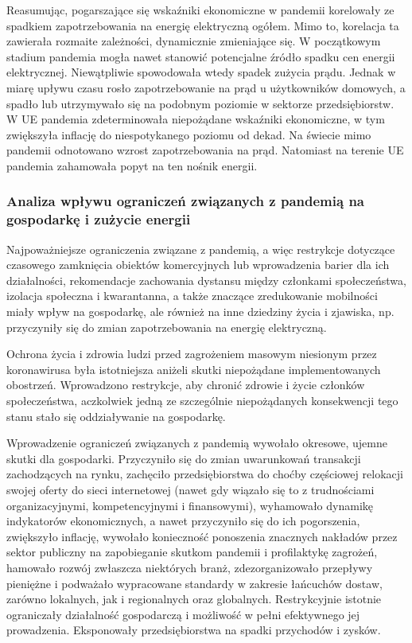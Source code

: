 \documentclass[polish, twoside, 12pt, a4paper]{article}
\theoremstyle{definition}
\theoremstyle{plain}
\theoremstyle{remark}
\begin{document}
Reasumując, pogarszające się wskaźniki ekonomiczne w pandemii korelowały ze spadkiem zapotrzebowania na energię elektryczną ogółem. Mimo to, korelacja ta zawierała rozmaite zależności, dynamicznie zmieniające się. W początkowym stadium pandemia mogła nawet stanowić potencjalne źródło spadku cen energii elektrycznej. Niewątpliwie spowodowała wtedy spadek zużycia prądu. Jednak w miarę upływu czasu rosło zapotrzebowanie na prąd u użytkowników domowych, a spadło lub utrzymywało się na podobnym poziomie w sektorze przedsiębiorstw. W UE pandemia zdeterminowała niepożądane wskaźniki ekonomiczne, w tym zwiększyła inflację do niespotykanego poziomu od dekad. Na świecie mimo pandemii odnotowano wzrost zapotrzebowania na prąd. Natomiast na terenie UE pandemia zahamowała popyt na ten nośnik energii.


\subsubsection{Analiza wpływu ograniczeń związanych z pandemią na gospodarkę i zużycie energii}

Najpoważniejsze ograniczenia związane z pandemią, a więc restrykcje dotyczące czasowego zamknięcia obiektów komercyjnych lub wprowadzenia barier dla ich działalności, rekomendacje zachowania dystansu między członkami społeczeństwa, izolacja społeczna i kwarantanna, a także znaczące zredukowanie mobilności miały wpływ na gospodarkę, ale również na inne dziedziny życia i zjawiska, np. przyczyniły się do zmian zapotrzebowania na energię elektryczną.

Ochrona życia i zdrowia ludzi przed zagrożeniem masowym niesionym przez koronawirusa była istotniejsza aniżeli skutki niepożądane implementowanych obostrzeń. Wprowadzono restrykcje, aby chronić zdrowie i życie członków społeczeństwa, aczkolwiek jedną ze szczególnie niepożądanych konsekwencji tego stanu stało się oddziaływanie na gospodarkę.  

Wprowadzenie ograniczeń związanych z pandemią wywołało okresowe, ujemne skutki dla gospodarki. Przyczyniło się do zmian uwarunkowań transakcji zachodzących na rynku, zachęciło przedsiębiorstwa do choćby częściowej relokacji swojej oferty do sieci internetowej (nawet gdy wiązało się to z trudnościami organizacyjnymi, kompetencyjnymi i finansowymi), wyhamowało dynamikę indykatorów ekonomicznych, a nawet przyczyniło się do ich pogorszenia, zwiększyło inflację, wywołało konieczność ponoszenia znacznych nakładów przez sektor publiczny na zapobieganie skutkom pandemii i profilaktykę zagrożeń, hamowało rozwój zwłaszcza niektórych branż, zdezorganizowało przepływy pieniężne i podważało wypracowane standardy w zakresie łańcuchów dostaw, zarówno lokalnych, jak i regionalnych oraz globalnych. Restrykcyjnie istotnie ograniczały działalność gospodarczą i możliwość w pełni efektywnego jej prowadzenia. Eksponowały przedsiębiorstwa na spadki przychodów i zysków. 
\end{document}
